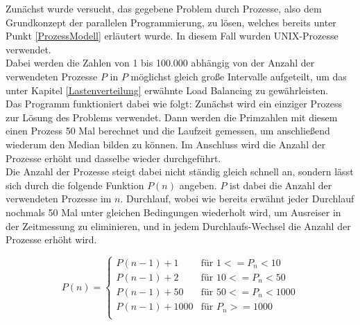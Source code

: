 \begin{description}
						Zunächst wurde versucht, das gegebene Problem durch Prozesse, also dem Grundkonzept der parallelen Programmierung, zu lösen, welches bereits unter Punkt \ref{ProzessModell} erläutert wurde. In diesem Fall wurden UNIX-Prozesse verwendet.\\
						Dabei werden die Zahlen von 1 bis 100.000 abhängig von der Anzahl der verwendeten Prozesse $P$ in $P$ möglichst gleich große Intervalle aufgeteilt, um das unter Kapitel \ref{Lastenverteilung} erwähnte Load Balancing zu gewährleisten.\\
						Das Programm funktioniert dabei wie folgt: Zunächst wird ein einziger Prozess zur Lösung des Problems verwendet. Dann werden die Primzahlen mit diesem einen Prozess 50 Mal berechnet und die Laufzeit gemessen, um anschließend wiederum den Median bilden zu können. Im Anschluss wird die Anzahl der Prozesse erhöht und dasselbe wieder durchgeführt.\\
						Die Anzahl der Prozesse steigt dabei nicht ständig gleich schnell an, sondern lässt sich durch die folgende Funktion $P(n)$ angeben. $P$ ist dabei die Anzahl der verwendeten Prozesse im $n$. Durchlauf, wobei wie bereits erwähnt jeder Durchlauf nochmals 50 Mal unter gleichen Bedingungen wiederholt wird, um Ausreiser in der Zeitmessung zu eliminieren, und in jedem Durchlaufs-Wechsel die Anzahl der Prozesse erhöht wird.
						
						\begin{equation}
						P(n) =
						\begin{cases}
						P(n - 1) + 1 & \text{für } 1 <= P_n < 10\\
						P(n - 1) + 2 & \text{für } 10 <= P_n < 50\\
						P(n - 1) + 50 & \text{für } 50 <= P_n < 1000\\
						P(n - 1) + 1000 & \text{für } P_n >= 1000\\
						\end{cases}
						\end{equation}
						

\end{description}
